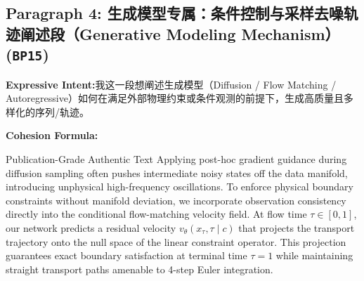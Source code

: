 \subsection*{Paragraph 4: 生成模型专属：条件控制与采样去噪轨迹阐述段（Generative Modeling Mechanism） (\texttt{BP15})}
\noindent\textbf{Expressive Intent:}\enspace 我这一段想阐述生成模型（Diffusion / Flow Matching / Autoregressive）如何在满足外部物理约束或条件观测的前提下，生成高质量且多样化的序列/轨迹。\par
\noindent\textbf{Cohesion Formula:}\par\vspace{4pt}
\begin{ExampleBox}{Publication-Grade Authentic Text}
Applying post-hoc gradient guidance during diffusion sampling often pushes intermediate noisy states off the data manifold, introducing unphysical high-frequency oscillations. To enforce physical boundary constraints without manifold deviation, we incorporate observation consistency directly into the conditional flow-matching velocity field. At flow time $\tau \in [0, 1]$, our network predicts a residual velocity $v_\theta(x_\tau, \tau \mid c)$ that projects the transport trajectory onto the null space of the linear constraint operator. This projection guarantees exact boundary satisfaction at terminal time $\tau=1$ while maintaining straight transport paths amenable to 4-step Euler integration.
\end{ExampleBox}
